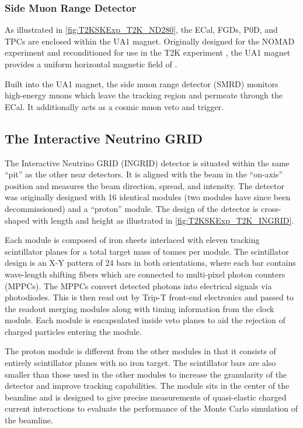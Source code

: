 \subsubsection{Side Muon Range Detector}
\label{subsubsec:T2KSKExp_T2K_SMRD}

As illustrated in \autoref{fig:T2KSKExp_T2K_ND280}, the ECal, FGDs, P0D, and TPCs are enclosed within the UA1 magnet. Originally designed for the NOMAD \cite{Vannucci2014} experiment and reconditioned for use in the T2K experiment \cite{cerncourier_2022}, the UA1 magnet provides a uniform horizontal magnetic field of .

Built into the UA1 magnet, the side muon range detector (SMRD)\cite{Aoki2013} monitors high-energy muons which leave the tracking region and permeate through the ECal. It additionally acts as a cosmic muon veto and trigger. 

\subsection{The Interactive Neutrino GRID}
\label{subsec:T2KSKExp_T2K_INGRID}

The Interactive Neutrino GRID (INGRID) detector is situated within the same ``pit'' as the other near detectors. It is aligned with the beam in the ``on-axis'' position and measures the beam direction, spread, and intensity. The detector was originally designed with 16 identical modules \cite{t2k_det} (two modules have since been decommissioned) and a ``proton'' module. The design of the detector is cross-shaped with length and height  as illustrated in \autoref{fig:T2KSKExp_T2K_INGRID}.

Each module is composed of iron sheets interlaced with eleven tracking scintillator planes for a total target mass of  tonnes per module. The scintillator design is an X-Y pattern of 24 bars in both orientations, where each bar contains wave-length shifting fibers which are connected to multi-pixel photon counters (MPPCs). The MPPCs convert detected photons into electrical signals via photodiodes. This is then read out by Trip-T front-end electronics \cite{Yokoyama2010} and passed to the readout merging modules along with timing information from the clock module. Each module is encapsulated inside veto planes to aid the rejection of charged particles entering the module.

The proton module is different from the other modules in that it consists of entirely scintillator planes with no iron target. The scintillator bars are also smaller than those used in the other modules to increase the granularity of the detector and improve tracking capabilities. The module sits in the center of the beamline and is designed to give precise measurements of quasi-elastic charged current interactions to evaluate the performance of the Monte Carlo simulation of the beamline. 

